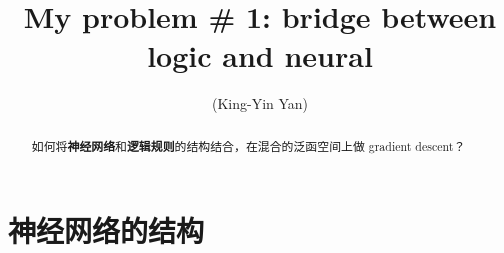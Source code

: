 \documentclass[orivec]{llncs}
\title{My problem \# 1: bridge between logic and neural}
\author{\usebox{\MyName} (King-Yin Yan)
}
\institute{General.Intelligence@Gmail.com}
\newcommand{\emp}[1]{\textbf{\textcolor{Cerulean}{#1}}}
\begin{document}
\maketitle
\setlength{\parindent}{0em}
\setlength{\parskip}{2.8ex}


\begin{abstract}
如何将\textbf{神经网络}和\textbf{逻辑规则}的结构结合，在混合的泛函空间上做 gradient descent？
\end{abstract}



\section{神经网络的结构}
\end{document}
